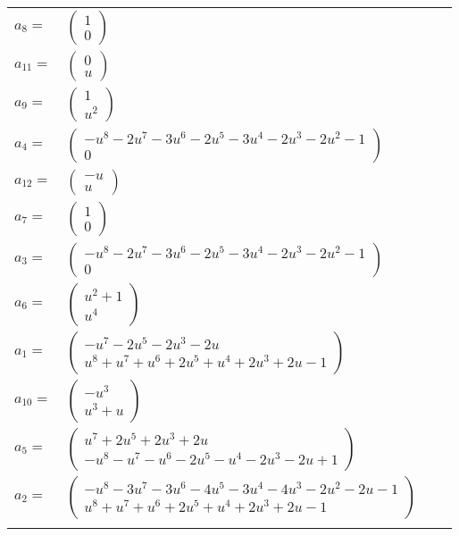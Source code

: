 \documentclass[1p]{elsarticle_modified}
\theoremstyle{definition}
\begin{document}
\begin{tabular}{m{7pt} m{180pt} m{7pt} m{180pt} }
\flushright $a_{8}=$&$\begin{pmatrix}1\\0\end{pmatrix}$ \\
\flushright $a_{11}=$&$\begin{pmatrix}0\\u\end{pmatrix}$ \\
\flushright $a_{9}=$&$\begin{pmatrix}1\\u^2\end{pmatrix}$ \\
\flushright $a_{4}=$&$\begin{pmatrix}- u^8-2 u^7-3 u^6-2 u^5-3 u^4-2 u^3-2 u^2-1\\0\end{pmatrix}$ \\
\flushright $a_{12}=$&$\begin{pmatrix}- u\\u\end{pmatrix}$ \\
\flushright $a_{7}=$&$\begin{pmatrix}1\\0\end{pmatrix}$ \\
\flushright $a_{3}=$&$\begin{pmatrix}- u^8-2 u^7-3 u^6-2 u^5-3 u^4-2 u^3-2 u^2-1\\0\end{pmatrix}$ \\
\flushright $a_{6}=$&$\begin{pmatrix}u^2+1\\u^4\end{pmatrix}$ \\
\flushright $a_{1}=$&$\begin{pmatrix}- u^7-2 u^5-2 u^3-2 u\\u^8+u^7+u^6+2 u^5+u^4+2 u^3+2 u-1\end{pmatrix}$ \\
\flushright $a_{10}=$&$\begin{pmatrix}- u^3\\u^3+u\end{pmatrix}$ \\
\flushright $a_{5}=$&$\begin{pmatrix}u^7+2 u^5+2 u^3+2 u\\- u^8- u^7- u^6-2 u^5- u^4-2 u^3-2 u+1\end{pmatrix}$ \\
\flushright $a_{2}=$&$\begin{pmatrix}- u^8-3 u^7-3 u^6-4 u^5-3 u^4-4 u^3-2 u^2-2 u-1\\u^8+u^7+u^6+2 u^5+u^4+2 u^3+2 u-1\end{pmatrix}$\\&\end{tabular}
\end{document}
